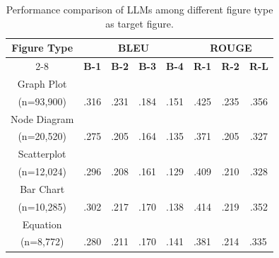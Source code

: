 \begin{table}[t]
\centering
\footnotesize
\renewcommand{\arraystretch}{1.2}
\setlength{\tabcolsep}{2pt}
\begin{tabular}{cccccccc}
\hline
\multirow{2}{*}{\textbf{Figure Type}} & \multicolumn{4}{c}{\textbf{BLEU}} & \multicolumn{3}{c}{\textbf{ROUGE}} \\ \cline{2-8} 
 & \textbf{B-1} & \textbf{B-2} & \textbf{B-3} & \textbf{B-4} & \textbf{R-1} & \textbf{R-2} & \textbf{R-L} \\ \hline
Graph Plot \\ (n=93,900) & .316 & .231 & .184 & .151 & .425 & .235 & .356 \\ \hline
Node Diagram \\ (n=20,520) & .275 & .205 & .164 & .135 & .371 & .205 & .327 \\ \hline
Scatterplot \\ (n=12,024) & .296 & .208 & .161 & .129 & .409 & .210 & .328 \\ \hline
Bar Chart \\ (n=10,285) & .302 & .217 & .170 & .138 & .414 & .219 & .352 \\ \hline
Equation \\ (n=8,772) & \multicolumn{1}{l}{.280} & \multicolumn{1}{l}{.211} & \multicolumn{1}{l}{.170} & \multicolumn{1}{l}{.141} & \multicolumn{1}{l}{.381} & \multicolumn{1}{l}{.214} & \multicolumn{1}{l}{.335} \\ \hline
\end{tabular}
\caption{Performance comparison of LLMs among different figure type as target figure.}
\label{tab:main-result-byType}
\end{table}